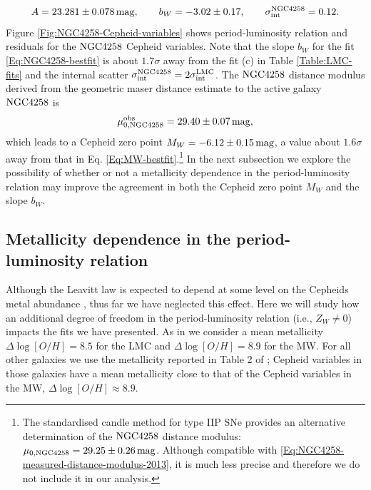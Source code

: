 \begin{equation}\label{Eq:NGC4258-bestfit}
A = 23.281 \pm 0.078\, \mathrm{mag}  , \qquad b_W = -3.02 \pm 0.17  , \qquad \sigma_{\mathrm{int}}^{\mathrm{NGC4258}} = 0.12 .
\end{equation}
Figure \ref{Fig:NGC4258-Cepheid-variables} shows period-luminosity relation and residuals for the $\mathrm{NGC4258}$ Cepheid variables. Note that the slope $b_W$ for the fit \eqref{Eq:NGC4258-bestfit} is about $1.7\sigma$ away from the fit (c) in Table \ref{Table:LMC-fits} and the internal scatter $\sigma_{\mathrm{int}}^{\mathrm{NGC4258}}=2\sigma_{\mathrm{int}}^{\mathrm{LMC}}$. The $\mathrm{NGC4258}$ distance modulus derived from the geometric maser distance estimate to the active galaxy $\mathrm{NGC4258}$ \cite{Humphreys:2013eja} is 
\begin{equation}
\mu_{0,\mathrm{NGC4258}}^{\mathrm{obs}} = 29.40 \pm 0.07\, \mathrm{mag},
\label{Eq:NGC4258-measured-distance-modulus-2013}
\end{equation}
which leads to a Cepheid zero point $M_W=-6.12 \pm 0.15\, \mathrm{mag}$, a value about $1.6\sigma$ away from that in Eq. \eqref{Eq:MW-bestfit}.\footnote{The standardised candle method for type IIP SNe \cite{Polshaw:2015ika} provides an alternative determination of the $\mathrm{NGC4258}$ distance modulus:
$\mu_{0,\mathrm{NGC4258}} = 29.25 \pm 0.26\, \mathrm{mag}$. Although compatible with \eqref{Eq:NGC4258-measured-distance-modulus-2013},  it is much less precise and therefore we do not include it in our analysis. }
In the next subsection we explore the possibility of whether or not a metallicity dependence in the period-luminosity relation may improve the agreement in both the Cepheid zero point $M_W$ and the slope $b_W$. 

\subsection{Metallicity dependence in the period-luminosity relation}\label{Subsection:Zw-dependence}

Although the Leavitt law is expected to depend at some level on the Cepheids metal abundance \cite{Freedman:2010xv}, thus far we have neglected this effect. Here we will study how an additional degree of freedom in the period-luminosity relation (i.e., $Z_W \neq 0$) impacts the fits we have presented. As in \cite{Efstathiou:2013via} we consider a mean metallicity $\Delta \log[O/H]=8.5$ for the LMC and $\Delta \log[O/H]=8.9$ for the MW. For all other galaxies we use the metallicity reported in Table 2 of \cite{Riess:2011yx}; Cepheid variables in those galaxies have a mean metallicity close to that of the Cepheid variables in the MW, $\Delta \log[O/H] \approx 8.9$.

